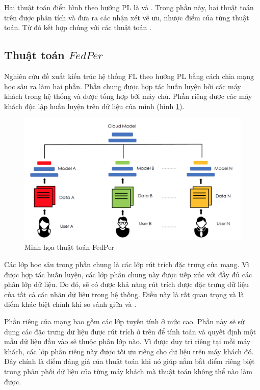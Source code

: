 Hai thuật toán điển hình theo hướng PL là  \cite{arivazhagan2019federated} và  \cite{liang2020think}. Trong phần này, hai thuật toán trên được phân tích và đưa ra các nhận xét về ưu, nhược điểm của từng thuật toán. Từ đó kết hợp chúng với các thuật toán .

\subsection{Thuật toán $FedPer$}

Nghiên cứu \cite{arivazhagan2019federated} đề xuất kiến trúc hệ thống FL theo hướng PL bằng cách chia mạng học sâu ra làm hai phần. Phần chung được hợp tác huấn luyện bởi các máy khách trong hệ thống và được tổng hợp bởi máy chủ. Phần riêng được các máy khách độc lập huấn luyện trên dữ liệu của mình (hình \ref{fig:fedper}).

\begin{figure}[H]
    \centering
    \includegraphics[scale=0.8]{../images/perlayer.png}
    \caption{Minh họa thuật toán FedPer \cite{arivazhagan2019federated}}
    \label{fig:fedper}
\end{figure}

Các lớp học sâu trong phần chung là các lớp rút trích đặc trưng của mạng. Vì được hợp tác huấn luyện, các lớp phần chung này được tiếp xúc với đầy đủ các phân lớp dữ liệu. Do đó, sẽ có được khả năng rút trích được đặc trưng dữ liệu của tất cả các nhãn dữ liệu trong hệ thống. Điều này là rất quan trọng và là điểm khác biệt chính khi so sánh giữa  và .

Phần riêng của mạng bao gồm các lớp tuyến tính ở mức cao. Phần này sẽ sử dụng các đặc trưng dữ liệu được rút trích ở trên để tính toán và quyết định một mẫu dữ liệu đầu vào sẽ thuộc phân lớp nào. Vì được duy trì riêng tại mỗi máy khách, các lớp phần riêng này được tối ưu riêng cho dữ liệu trên máy khách đó. Đây chính là điểm đáng giá của thuật toán  khi nó giúp nắm bắt điểm riêng biệt trong phân phối dữ liệu của từng máy khách mà thuật toán  không thể nào làm được.

